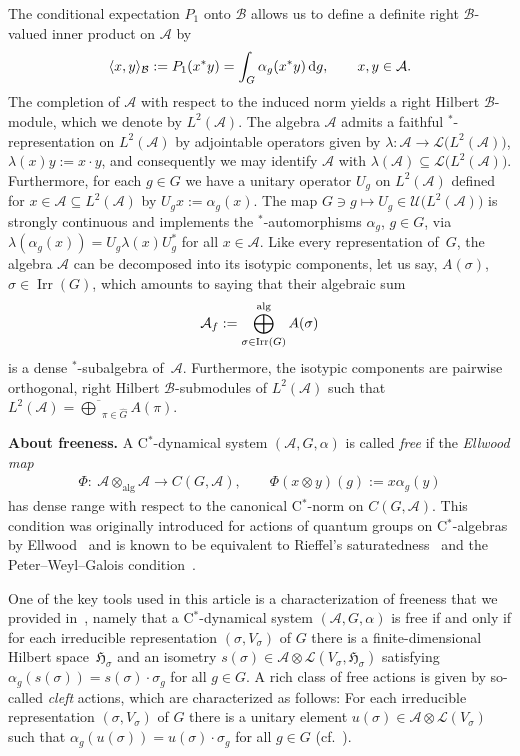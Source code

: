 \documentclass[pdftex]{sigma}
\numberwithin{equation}{section}
\newcommand*{\tensor}{\otimes}		%
\DeclarePairedDelimiter{\scal}{\langle}{\rangle}	%
\newcommand*{\Star}{$^*$\nobreakdash}
\newcommand*{\hilb}{\mathfrak}		%
\newcommand*{\alg}{\mathcal}		%
\newcommand*{\hH}{\hilb{H}}			%
\newcommand*{\aA}{\alg{A}}			%
\newcommand*{\aB}{\alg{B}} 			%
\newcommand*{\End}{\mathcal{L}} %
\newcommand*{\Cont}{C}
\DeclareMathOperator{\Irrep}{Irr} 			%
\begin{document}
The conditional expectation $P_1$ onto $\aB$ allows us to define a definite right $\aB$\nobreakdash-valued inner product on $\aA$ by
\begin{gather*}
	\scal{x,y}_\aB := P_1(x^*y) = \int_G \alpha_g(x^*y) \, {\rm d}g,
	\qquad
	x,y \in \aA.
\end{gather*}
The completion of $\aA$ with respect to the induced norm yields a right Hilbert $\aB$\nobreakdash-module, which we denote by $L^2(\aA)$.
The algebra $\aA$ admits a faithful \Star-representation on $L^2(\aA)$ by adjointable operators given by $\lambda\colon \aA \to \End \big( L^2(\aA) \big)$, $\lambda(x)y := x \cdot y$, and consequently we may identify $\aA$ with $\lambda(\aA) \subseteq \End \big( L^2(\aA) \big)$.
Furthermore, for each $g \in G$ we have a unitary operator $U_g$ on $L^2(\aA)$ defined for $x \in \aA \subseteq L^2(\aA)$ by $U_g x := \alpha_g(x)$.
The map $G \ni g \mapsto U_g \in \mathcal{U}\big( L^2(\aA) \big)$ is strongly continuous and implements the \Star-automorphisms $\alpha_g$, $g \in G$, via $\lambda ( \alpha_g(x)) = U_g \lambda(x) U_g^*$ for all $x \in \aA$.
Like every representation of~$G$, the algebra $\aA$ can be decomposed into its isotypic components, let us say, $A(\sigma)$, $\sigma \in \Irrep(G)$, which amounts to saying that their algebraic sum
\begin{gather*}
	\aA_f:= \bigoplus_{\sigma \in \Irrep(G)}^{\rm alg} A(\sigma)
\end{gather*}
is a dense \Star-subalgebra of~$\aA$.
Furthermore, the isotypic components are pairwise orthogonal, right Hilbert $\aB$-submodules of $L^2(\aA)$ such that $L^2(\aA) = \overline{\bigoplus}_{\pi \in \hat G} A(\pi)$.

{\bf About freeness.}
A C\Star-dynamical system $(\aA,G,\alpha)$ is called \emph{free} if the \emph{Ellwood map}
\begin{align*}
	\Phi\colon \ \aA \tensor_{\text{alg}} \aA \rightarrow C(G,\aA),
	\qquad
	\Phi(x\tensor y)(g):=x \alpha_g(y)
\end{align*}
has dense range with respect to the canonical C\Star-norm on $\Cont(G,\aA)$.
This condition was originally introduced for actions of quantum groups on C\Star-algebras by Ellwood~\cite{Ell00} and is known to be equivalent to Rieffel's saturatedness~\cite{Rieffel91} and the Peter--Weyl--Galois condition~\cite{BaCoHa15}.

One of the key tools used in this article is a characterization of freeness that we provided in~\cite[Lemma~3.3]{SchWa17c}, namely that a C\Star-dynamical system $(\aA,G,\alpha)$ is free if and only if for each irreducible representation $(\sigma,V_\sigma)$ of $G$ there is a finite-dimensional Hilbert space~$\hH_\sigma$ and an isometry $s(\sigma) \in \aA \tensor \End(V_\sigma,\hH_\sigma)$ satisfying $\alpha_g(s(\sigma))=s(\sigma) \cdot \sigma_g$ for all $g \in G$.
A rich class of free actions is given by so-called \emph{cleft} actions, which are characterized as follows:
For each irreducible representation $(\sigma,V_\sigma)$ of $G$ there is a unitary element \mbox{$u(\sigma) \in \aA \tensor \End(V_\sigma)$} such that $\alpha_g(u(\sigma))=u(\sigma) \cdot \sigma_g$ for all $g \in G$ (cf.~\cite[Definition~4.1]{SchWa17b}).
\end{document}
